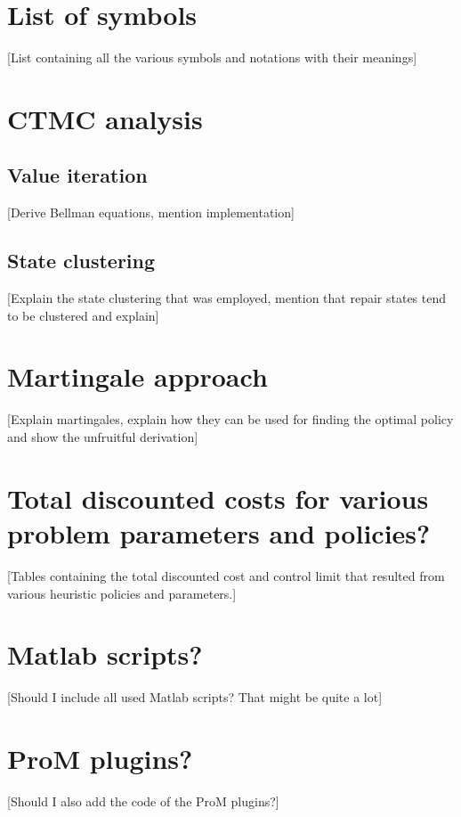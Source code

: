 \begin{appendices}
\chapter{List of symbols}
[List containing all the various symbols and notations with their meanings]
\chapter{CTMC analysis}
\section{Value iteration}
[Derive Bellman equations, mention implementation]
\section{State clustering}
[Explain the state clustering that was employed, mention that repair states tend to be clustered and explain]
\chapter{Martingale approach}
[Explain martingales, explain how they can be used for finding the optimal policy and show the unfruitful derivation]
\chapter{Total discounted costs for various problem parameters and policies?}
[Tables containing the total discounted cost and control limit that resulted from various heuristic policies and parameters.]
\chapter{Matlab scripts?}
[Should I include all used Matlab scripts? That might be quite a lot]
\chapter{ProM plugins?}
[Should I also add the code of the ProM plugins?]
\end{appendices}
